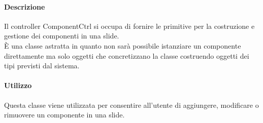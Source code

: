    \paragraph{Descrizione}
	Il controller ComponentCtrl si occupa di fornire le primitive per la costruzione e gestione dei componenti in una slide.\\
	È una classe astratta in quanto non sarà possibile istanziare un componente direttamente ma solo oggetti che concretizzano la classe costruendo oggetti dei tipi previsti dal sistema.\\
		
	\paragraph{Utilizzo}
	Questa classe viene utilizzata per consentire all'utente di aggiungere, modificare o rimuovere un componente in una slide.
	
